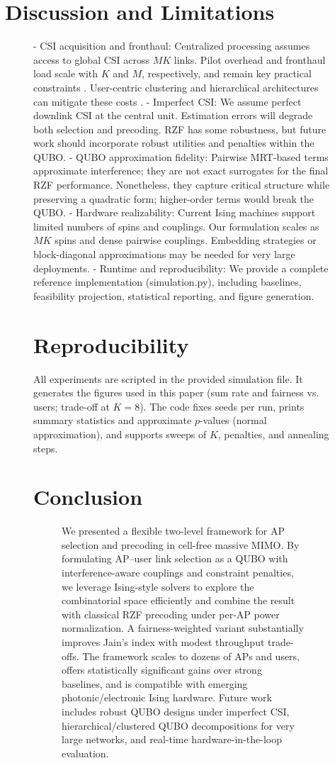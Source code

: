 {\section{Discussion and Limitations}
\begin{figure}[htbp]
- CSI acquisition and fronthaul: Centralized processing assumes access to global CSI across $MK$ links. Pilot overhead and fronthaul load scale with $K$ and $M$, respectively, and remain key practical constraints \cite{bjornson2016massive,demir2021foundations}. User-centric clustering and hierarchical architectures can mitigate these costs \cite{chen2020structured}.
- Imperfect CSI: We assume perfect downlink CSI at the central unit. Estimation errors will degrade both selection and precoding. RZF has some robustness, but future work should incorporate robust utilities and penalties within the QUBO.
- QUBO approximation fidelity: Pairwise MRT-based terms approximate interference; they are not exact surrogates for the final RZF performance. Nonetheless, they capture critical structure while preserving a quadratic form; higher-order terms would break the QUBO.
- Hardware realizability: Current Ising machines support limited numbers of spins and couplings. Our formulation scales as $MK$ spins and dense pairwise couplings. Embedding strategies or block-diagonal approximations may be needed for very large deployments.
- Runtime and reproducibility: We provide a complete reference implementation (simulation.py), including baselines, feasibility projection, statistical reporting, and figure generation.

\section{Reproducibility}

All experiments are scripted in the provided simulation file. It generates the figures used in this paper (sum rate and fairness vs. users; trade-off at $K=8$). The code fixes seeds per run, prints summary statistics and approximate $p$-values (normal approximation), and supports sweeps of $K$, penalties, and annealing steps.

\section{Conclusion}
\begin{figure}[htbp]
We presented a flexible two-level framework for AP selection and precoding in cell-free massive MIMO. By formulating AP–user link selection as a QUBO with interference-aware couplings and constraint penalties, we leverage Ising-style solvers to explore the combinatorial space efficiently and combine the result with classical RZF precoding under per-AP power normalization. A fairness-weighted variant substantially improves Jain’s index with modest throughput trade-offs. The framework scales to dozens of APs and users, offers statistically significant gains over strong baselines, and is compatible with emerging photonic/electronic Ising hardware. Future work includes robust QUBO designs under imperfect CSI, hierarchical/clustered QUBO decompositions for very large networks, and real-time hardware-in-the-loop evaluation.


\end{figure}
\end{figure}}
